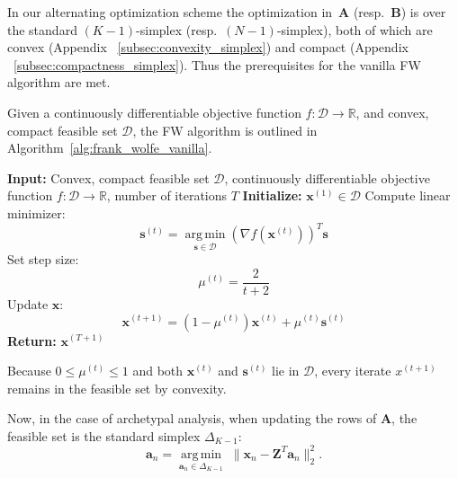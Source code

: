 \documentclass{article}
\DeclareMathOperator*{\argmin}{arg\,min}
\begin{document}
In our alternating optimization scheme the optimization in~$\mathbf{A}$ (resp.\ $\mathbf{B}$) is over the standard $(K-1)$-simplex (resp.\ $(N-1)$-simplex), both of which are convex (Appendix ~\ref{subsec:convexity_simplex}) and compact (Appendix ~\ref{subsec:compactness_simplex}).  Thus the prerequisites for the vanilla FW algorithm are met.

Given a continuously differentiable objective function $f: \mathcal{D} \rightarrow \mathbb{R}$, and convex, compact feasible set $\mathcal{D}$, the FW algorithm is outlined in Algorithm~\ref{alg:frank_wolfe_vanilla}.

\begin{algorithm}[H]
    \caption{Vanilla Frank-Wolfe \autocite{frankAlgorithmQuadraticProgramming1956a, jaggiRevisitingFrankWolfeProjectionFree2013}}
    \label{alg:frank_wolfe_vanilla}
    \begin{algorithmic}[1]
    \State \textbf{Input:} Convex, compact feasible set $\mathcal{D}$, continuously differentiable objective function $f: \mathcal{D} \rightarrow \mathbb{R}$, number of iterations $T$
    \State \textbf{Initialize:} $\mathbf{x}^{(1)} \in \mathcal{D}$
        \State Compute linear minimizer:
        \begin{equation}
        \mathbf{s}^{(t)} = \operatorname*{arg\,min}_{\mathbf{s} \in \mathcal{D}} \left( \nabla f\left(\mathbf{x}^{(t)}\right) \right)^T \mathbf{s}
        \end{equation}
        \State Set step size:
        \begin{equation}
        \mu^{(t)} = \frac{2}{t+2}
        \end{equation}
        \State Update $\mathbf{x}$:
        \begin{equation}
        \mathbf{x}^{(t+1)} = (1-\mu^{(t)}) \mathbf{x}^{(t)} + \mu^{(t)} \mathbf{s}^{(t)}
        \end{equation}
    \EndFor
    \State \textbf{Return:} $\mathbf{x}^{(T+1)}$
    \end{algorithmic}
\end{algorithm}

Because $0 \le \mu^{(t)} \le 1$ and both $\mathbf{x}^{(t)}$ and $\mathbf{s}^{(t)}$ lie in $\mathcal{D}$, every iterate $x^{(t+1)}$ remains in the feasible set by convexity.

Now, in the case of archetypal analysis, when updating the rows of $\mathbf{A}$, the feasible set is the standard simplex $\Delta_{K-1}$:\begin{equation}
    \mathbf{a}_n = \underset{\mathbf{a}_n \in \Delta_{K-1}}{\argmin} \;\|\mathbf{x}_n - \mathbf{Z}^T \mathbf{a}_n\|_2^2.
\end{equation}
\end{document}

